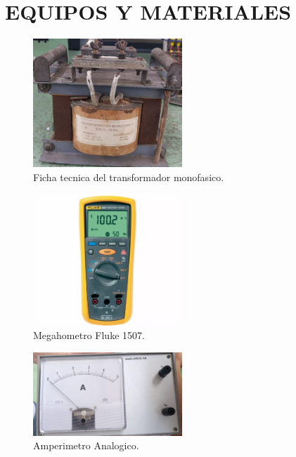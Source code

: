\documentclass[a4paper,12pt]{article} %
\begin{document}
        \section{EQUIPOS Y MATERIALES}
        \begin{figure}[h] %
            \centering
            \includegraphics[width=0.5\textwidth]{img/Transformador monofasico.png} %
            \caption{Ficha tecnica del transformador monofasico.}
            \label{fig:mi_imagen}
        \end{figure}
        \begin{figure}[h] %
            \centering
            \includegraphics[width=0.5\textwidth]{img/Megahometro megger.png} %
            \caption{Megahometro Fluke 1507.}
            \label{fig:megahometro}
        \end{figure}
        \begin{figure}[h] %
            \centering
            \includegraphics[width=0.5\textwidth]{img/Amperimetro Analogico.png} %
            \caption{Amperimetro Analogico.}
            \label{fig:AmpAnalogico}
        \end{figure}
\end{document}
